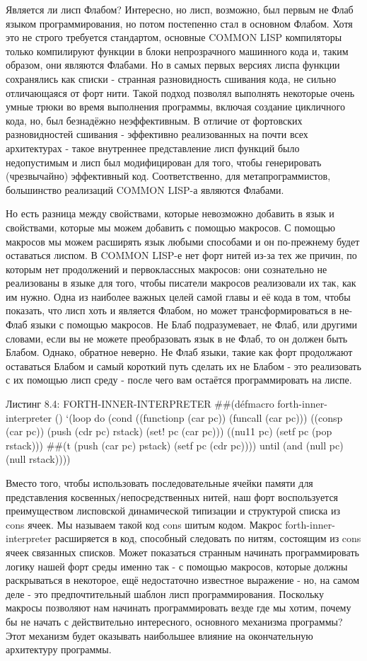 Является ли лисп Флабом? Интересно, но лисп, возможно, был первым не Флаб языком программирования, но потом постепенно стал в основном Флабом. Хотя это не строго требуется стандартом, основные COMMON LISP компиляторы только компилируют функции в блоки непрозрачного машинного кода и, таким образом, они являются Флабами. Но в самых первых версиях лиспа функции сохранялись как списки - странная разновидность сшивания кода, не сильно отличающаяся от форт нити. Такой подход позволял выполнять некоторые очень умные трюки во время выполнения программы, включая создание цикличного кода, но, был безнадёжно неэффективным. В отличие от фортовских разновидностей сшивания - эффективно реализованных на почти всех архитектурах - такое внутреннее представление лисп функций было недопустимым и лисп был модифицирован для того, чтобы генерировать (чрезвычайно) эффективный код. Соответственно, для метапрограммистов, большинство реализаций COMMON LISP-а являются Флабами.

Но есть разница между свойствами, которые невозможно добавить в язык и свойствами, которые мы можем добавить с помощью макросов. С помощью макросов мы можем расширять язык любыми способами и он по-прежнему будет оставаться лиспом. В COMMON LISP-е нет форт нитей из-за тех же причин, по которым нет продолжений и первоклассных макросов: они сознательно не реализованы в языке для того, чтобы писатели макросов реализовали их так, как им нужно. Одна из наиболее важных целей самой главы и её кода в том, чтобы показать, что лисп хоть и является Флабом, но может трансформироваться в не-Флаб языки с помощью макросов. Не Блаб подразумевает, не Флаб, или другими словами, если вы не можете преобразовать язык в не Флаб, то он должен быть Блабом. Однако, обратное неверно. Не Флаб языки, такие как форт продолжают оставаться Блабом и самый короткий путь сделать их не Блабом - это реализовать с их помощью лисп среду - после чего вам остаётся программировать на лиспе.

Листинг 8.4: FORTH-INNER-INTERPRETER
##(défmacro forth-inner-interpreter ()
‘(loop
do (cond
((functionp (car pc))
(funcall (car pc)))
((consp (car pc))
(push (cdr pc) rstack)
(set! pc (car pc)))
((nu11 pc)
(setf pc (pop rstack)))
##(t
(push (car pc) pstack)
(setf pc (cdr pc))))
until (and (null pc) (null rstack)))) 

Вместо того, чтобы использовать последовательные ячейки памяти для представления косвенных/непосредственных нитей, наш форт воспользуется преимуществом лисповской динамической типизации и структурой списка из cons ячеек. Мы называем такой код cons шитым кодом. Макрос forth-inner-interpreter расширяется в код, способный следовать по нитям, состоящим из cons ячеек связанных списков. Может показаться странным начинать программировать логику нашей форт среды именно так - с помощью макросов, которые должны раскрываться в некоторое, ещё недостаточно известное выражение - но, на самом деле - это предпочтительный шаблон лисп программирования. Поскольку макросы позволяют нам начинать программировать везде где мы хотим, почему бы не начать с действительно интересного, основного механизма программы? Этот механизм будет оказывать наибольшее влияние на окончательную архитектуру программы.

